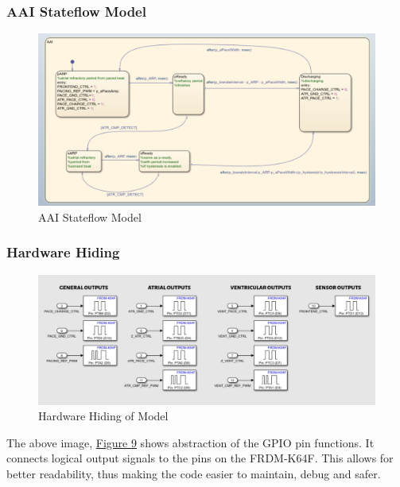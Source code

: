 \documentclass{article}
\begin{document}
\newpage
\subsubsection{AAI Stateflow Model}
\begin{tcolorbox}
    \begin{figure}[H]
        \includegraphics[width=\textwidth]{AAI.png}
        \caption{AAI Stateflow Model}
        \label{AAISF}
    \end{figure}
\end{tcolorbox}

\newpage
\subsubsection{Hardware Hiding}

\begin{tcolorbox}
    \begin{figure}[H]
        \includegraphics[width=\textwidth]{HardwareHiding.png}
        \caption{Hardware Hiding of Model}
        \label{HardHide}
    \end{figure}
\end{tcolorbox}

The above image, \hyperref[HardHide]{Figure 9} shows abstraction of the GPIO pin functions. 
It connects logical output signals to the pins on the FRDM-K64F. This allows for better readability,
thus making the code easier to maintain, debug and safer. 
\end{document}

